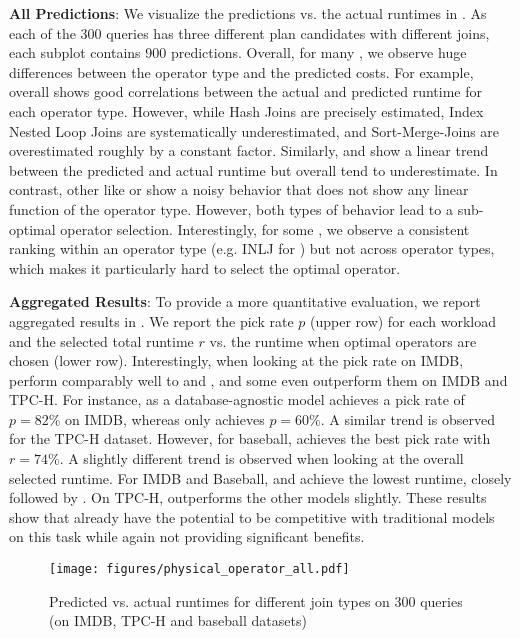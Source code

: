 \textbf{All Predictions}: 
We visualize the predictions vs. the actual runtimes in .
As each of the 300 queries has three different plan candidates with different joins, each subplot contains 900 predictions.
Overall, for many \lcms, we observe huge differences between the operator type and the predicted costs.
For example, \zeroshot overall shows good correlations between the actual and predicted runtime for each operator type.
However, while Hash Joins are precisely estimated, Index Nested Loop Joins are systematically underestimated, and Sort-Merge-Joins are overestimated roughly by a constant factor.
Similarly, \postgresx and \postgresxvi show a linear trend between the predicted and actual runtime but overall tend to underestimate.
In contrast, other \lcms like \etoe or \dace show a noisy behavior that does not show any linear function of the operator type.
However, both types of behavior lead to a sub-optimal operator selection.
Interestingly, for some \lcms, we observe a consistent ranking within an operator type (e.g. INLJ for \flatvector) but not across operator types, which makes it particularly hard to select the optimal operator. 

\textbf{Aggregated Results}:
To provide a more quantitative evaluation, we report aggregated results in .
We report the pick rate $p$ (upper row) for each workload and the selected total runtime $r$ vs. the runtime when optimal operators are chosen (lower row).
Interestingly, when looking at the pick rate on IMDB, \lcms perform comparably well to \postgresx and \postgresxvi, and some even outperform them on IMDB and TPC-H.
For instance, \dace as a database-agnostic model achieves a pick rate of $p=82\%$ on IMDB, whereas \postgresx only achieves $p=60\%$.
A similar trend is observed for the TPC-H dataset.
However, for baseball, \postgresxvi achieves the best pick rate with $r=74\%$.
A slightly different trend is observed when looking at the overall selected runtime.
For IMDB and Baseball, \postgresx and \postgresxvi achieve the lowest runtime, closely followed by \dace. 
On TPC-H, \dace outperforms the other models slightly.
These results show that \lcms already have the potential to be competitive with traditional models on this task while again not providing significant benefits.

\begin{figure}
    \centering
    \texttt{[image: figures/physical\_operator\_all.pdf]}
    \caption{Predicted vs. actual runtimes for different join types on 300 queries (on  IMDB, TPC-H and baseball datasets)}
\label{fig:physical_operator_all}
\end{figure}

